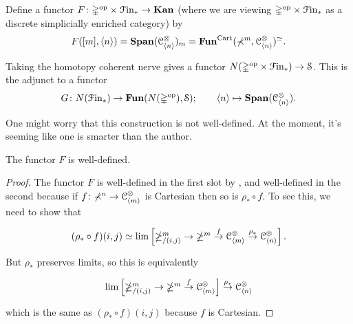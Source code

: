 \documentclass[main.tex]{subfiles}
\begin{document}
\begin{definition}
  Define a functor $F\colon \mathbb{\Delta}^{\mathrm{op}} \times \mathcal{F}\mathrm{in}_{*} \to \mathbf{Kan}$ (where we are viewing $\mathbb{\Delta}^{\mathrm{op}} \times \mathcal{F}\mathrm{in}_{*}$ as a discrete simplicially enriched category) by
  \begin{equation*}
    F([m], \langle n \rangle) = \mathbf{Span}(\mathcal{C}^{\otimes}_{\langle n \rangle})_{m} = \mathbf{Fun}^{\mathrm{Cart}}(\mathbb{\Sigma}^{m}, \mathcal{C}^{\otimes}_{\langle n \rangle})^{\simeq}.
  \end{equation*}

  Taking the homotopy coherent nerve gives a functor $N(\mathbb{\Delta}^{\mathrm{op}} \times \mathcal{F}\mathrm{in}_{*}) \to \mathcal{S}$. This is the adjunct to a functor
  \begin{equation*}
    G\colon N(\mathcal{F}\mathrm{in}_{*}) \to \mathbf{Fun}(N(\mathbb{\Delta}^{\mathrm{op}}), \mathcal{S});\qquad \langle n \rangle \mapsto \mathbf{Span}(\mathcal{C}^{\otimes}_{\langle n \rangle}).
  \end{equation*}
\end{definition}

One might worry that this construction is not well-defined. At the moment, it's seeming like one is smarter than the author.

\begin{lemma}
  The functor $F$ is well-defined.
\end{lemma}
\begin{proof}
  The functor $F$ is well-defined in the first slot by \cite[Prop. 5.9]{1409.0837}, and well-defined in the second because if $f\colon \mathbb{\Sigma}^{n} \to \mathcal{C}^{\otimes}_{\langle m \rangle}$ is Cartesian then so is $\rho_{*} \circ f$. To see this, we need to show that
  \begin{equation*}
    \begin{tikzcd}
      (\rho_{*} \circ f)(i, j) \simeq \lim\left[ \Lam^{m}_{/(i, j)} \to \Lam^{m} \overset{f}{\to} \category{C}^{\otimes}_{\langle m \rangle} \overset{\rho_{*}}{\to} \category{C}^{\otimes}_{\langle n \rangle} \right].
    \end{tikzcd}
  \end{equation*}
  But $\rho_{*}$ preserves limits, so this is equivalently
  \begin{equation*}
    \begin{tikzcd}
      \lim\left[ \Lam^{m}_{/(i, j)} \to \Lam^{m} \overset{f}{\to} \category{C}^{\otimes}_{\langle m \rangle} \right] \overset{\rho_{*}}{\to} \category{C}^{\otimes}_{\langle n \rangle}
    \end{tikzcd}
  \end{equation*}
  which is the same as $(\rho_{*} \circ f)(i,j)$ because $f$ is Cartesian.
\end{proof}
\end{document}
